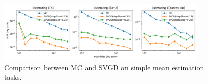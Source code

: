 \begin{figure}[!htbp]
    \centering
    \includegraphics[width=0.9\textwidth]{figs/toy-figure2-merged.png}
    \caption{Comparison between MC and SVGD on simple mean estimation tasks. }
    \label{fig:toy1dmc}
\end{figure}
